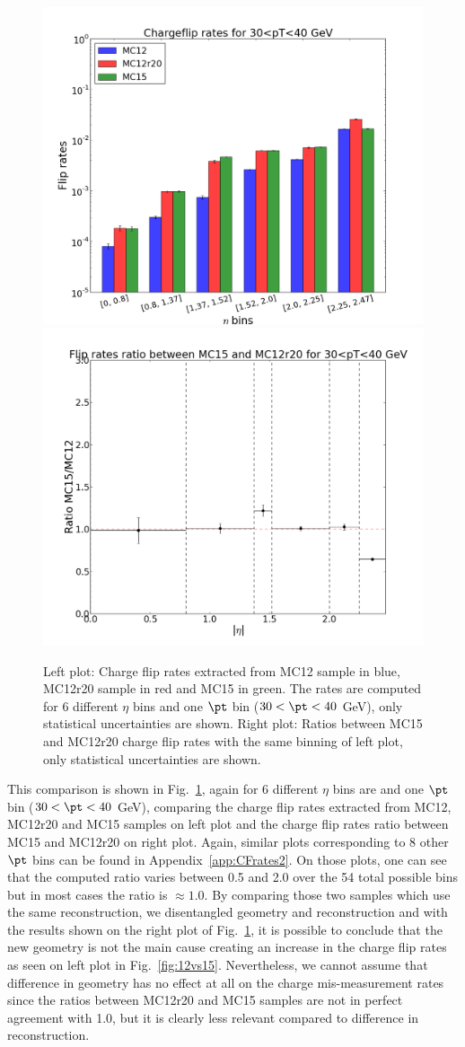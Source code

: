 \begin{figure}[!htb]
\begin{center}
\includegraphics[width=0.4\linewidth]{FIGURES/BKG/chargeFlip/APPENDIX/fliprates_MC12r20/fliprates_3samples_30.png}
\includegraphics[width=0.4\linewidth]{FIGURES/BKG/chargeFlip/APPENDIX/ratio_MC15vsMC12r20/ratio_plot_30.png}
\end{center}
\caption{\label{fig:12r20vs15} Left plot: Charge flip rates extracted from MC12 sample in blue, MC12r20 sample in red and MC15 in green. The rates are computed for 6 different $\eta$ bins and one $\pt$ bin ($30<\pt<40$ GeV), only statistical uncertainties are shown. Right plot: Ratios between MC15 and MC12r20 charge flip rates with the same binning of left plot, only statistical uncertainties are shown.}
\end{figure}

This comparison is shown in Fig.~\ref{fig:12r20vs15}, again for 6 different $\eta$ bins are and one $\pt$ bin ($30<\pt<40$ GeV), comparing the charge flip rates extracted from MC12, MC12r20 and MC15 samples on left plot and the charge flip rates ratio between MC15 and MC12r20 on right plot. Again, similar plots corresponding to 8 other $\pt$ bins can be found in Appendix~\ref{app:CFrates2}. On those plots, one can see that the computed ratio varies between 0.5 and 2.0 over the 54 total possible bins but in most cases the ratio is $\approx 1.0$. By comparing those two samples which use the same reconstruction, we disentangled geometry and reconstruction and with the results shown on the right plot of Fig.~\ref{fig:12r20vs15}, it is possible to conclude that the new geometry is not the main cause creating an increase in the charge flip rates as seen on left plot in Fig.~\ref{fig:12vs15}. Nevertheless, we cannot assume that difference in geometry has no effect at all on the charge mis-measurement rates since the ratios between MC12r20 and MC15 samples are not in perfect agreement with 1.0, but it is clearly less relevant compared to difference in reconstruction.

